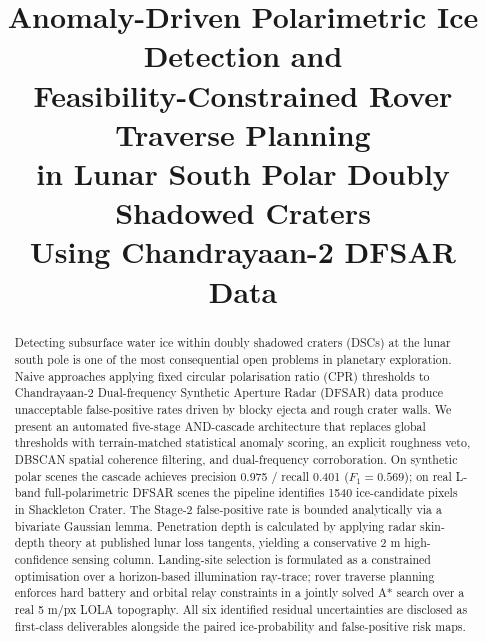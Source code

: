 \documentclass[10pt,conference]{IEEEtran}
\begin{document}
\title{Anomaly-Driven Polarimetric Ice Detection and\\
Feasibility-Constrained Rover Traverse Planning\\
in Lunar South Polar Doubly Shadowed Craters\\
Using Chandrayaan-2 DFSAR Data}

\author{
}

\maketitle

\begin{abstract}
Detecting subsurface water ice within doubly shadowed craters (DSCs) at the lunar south pole is one of the most consequential open problems in planetary exploration. Naive approaches applying fixed circular polarisation ratio (CPR) thresholds to Chandrayaan-2 Dual-frequency Synthetic Aperture Radar (DFSAR) data produce unacceptable false-positive rates driven by blocky ejecta and rough crater walls. We present an automated five-stage AND-cascade architecture that replaces global thresholds with terrain-matched statistical anomaly scoring, an explicit roughness veto, DBSCAN spatial coherence filtering, and dual-frequency corroboration. On synthetic polar scenes the cascade achieves precision 0.975 / recall 0.401 ($F_1 = 0.569$); on real L-band full-polarimetric DFSAR scenes the pipeline identifies 1540 ice-candidate pixels in Shackleton Crater. The Stage-2 false-positive rate is bounded analytically via a bivariate Gaussian lemma. Penetration depth is calculated by applying radar skin-depth theory at published lunar loss tangents, yielding a conservative 2 m high-confidence sensing column. Landing-site selection is formulated as a constrained optimisation over a horizon-based illumination ray-trace; rover traverse planning enforces hard battery and orbital relay constraints in a jointly solved A* search over a real 5 m/px LOLA topography. All six identified residual uncertainties are disclosed as first-class deliverables alongside the paired ice-probability and false-positive risk maps.
\end{abstract}
\end{document}
